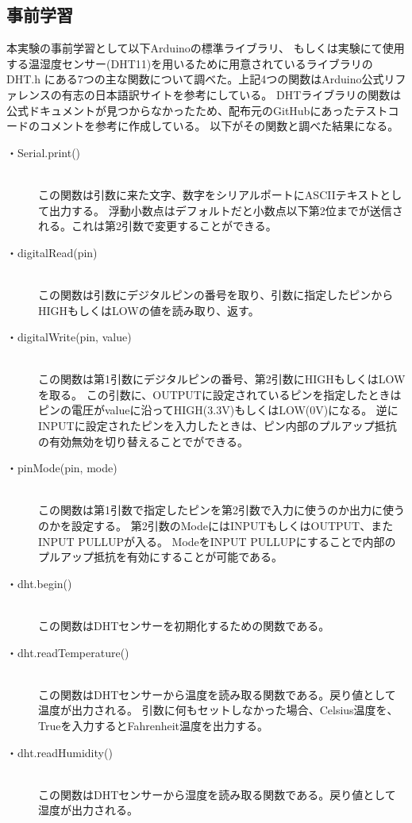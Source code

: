 \documentclass[a4paper,11pt,titlepage,dvipdfmx]{jsarticle}
\begin{document}
\subsection{事前学習}
本実験の事前学習として以下Arduinoの標準ライブラリ、
もしくは実験にて使用する温湿度センサー(DHT11)を用いるために用意されているライブラリのDHT.h
にある7つの主な関数について調べた。上記4つの関数はArduino公式リファレンスの有志の日本語訳サイト\cite{ref}を参考にしている。
DHTライブラリの関数は公式ドキュメントが見つからなかったため、配布元のGitHub\cite{DHTgit}にあったテストコードのコメントを参考に作成している。
以下がその関数と調べた結果になる。
\begin{description}
    \item[・Serial.print()]\mbox{}\\
    この関数は引数に来た文字、数字をシリアルポートにASCIIテキストとして出力する。
    浮動小数点はデフォルトだと小数点以下第2位までが送信される。これは第2引数で変更することができる。
    \item[・digitalRead(pin)]\mbox{}\\
    この関数は引数にデジタルピンの番号を取り、引数に指定したピンからHIGHもしくはLOWの値を読み取り、返す。
    \item[・digitalWrite(pin, value)]\mbox{}\\
    この関数は第1引数にデジタルピンの番号、第2引数にHIGHもしくはLOWを取る。
    この引数に、OUTPUTに設定されているピンを指定したときはピンの電圧がvalueに沿ってHIGH(3.3V)もしくはLOW(0V)になる。
    逆にINPUTに設定されたピンを入力したときは、ピン内部のプルアップ抵抗の有効無効を切り替えることでができる。
    \item[・pinMode(pin, mode)]\mbox{}\\
    この関数は第1引数で指定したピンを第2引数で入力に使うのか出力に使うのかを設定する。
    第2引数のModeにはINPUTもしくはOUTPUT、またINPUT PULLUPが入る。
    ModeをINPUT PULLUPにすることで内部のプルアップ抵抗を有効にすることが可能である。
    \item[・dht.begin()]\mbox{}\\
    この関数はDHTセンサーを初期化するための関数である。
    \item[・dht.readTemperature()]\mbox{}\\
    この関数はDHTセンサーから温度を読み取る関数である。戻り値として温度が出力される。
    引数に何もセットしなかった場合、Celsius温度を、Trueを入力するとFahrenheit温度を出力する。
    \item[・dht.readHumidity()]\mbox{}\\
    この関数はDHTセンサーから湿度を読み取る関数である。戻り値として湿度が出力される。
\end{description}
\end{document}
